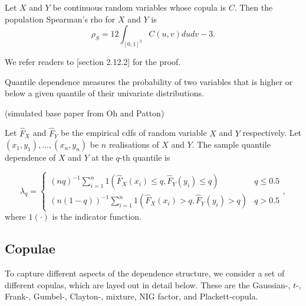   \begin{theo}
    Let $X$ and $Y$ be continuous random variables whose copula is $C$. 
    Then the population Spearman's rho for $X$ and $Y$ is 
    \[\rho_S = 12\int_{[0,1]^2}C(u,v)dudv-3. \]
  \end{theo}

We refer readers to \cite{joe1997multivariate}[section 2.12.2] for the proof. 

Quantile dependence measures the probability of two variables that is higher or below a given quantile of their univariate distributions.

(simulated base paper from Oh and Patton)
\begin{defi} 
  Let $\hat F_X$ and $\hat F_Y$ be the empirical cdfs of random variable $X$ and $Y$ respectively.
  Let $(x_1, y_1),...,(x_n, y_n)$ be $n$ realisations of $X$ and $Y$. 
  The sample quantile dependence of $X$ and $Y$ at the $q$-th quantile is 

  \begin{equation*}
    \lambda_q = \begin{cases}
      (nq)^{-1}\sum_{i=1}^n 1\left( 
        \hat F_X(x_i) \leq q, \hat F_Y(y_i) \leq q 
      \right) & q \leq 0.5 \\
      (n(1-q))^{-1}\sum_{i=1}^n 1\left( 
        \hat F_X(x_i) > q, \hat  F_Y(y_i) > q 
      \right) & q > 0.5 
    \end{cases},
  \end{equation*}
  where $1(\cdot)$ is the indicator function. 

\end{defi}

\subsection{Copulae}\label{sec:ellpitical-copulae}

To capture different aspects of the dependence structure, we consider
a set of different copulas, which are layed
  out in detail below. These are the Gaussian-, $t$-, Frank-,
Gumbel-, Clayton-, mixture, NIG factor, and Plackett-copula. 

